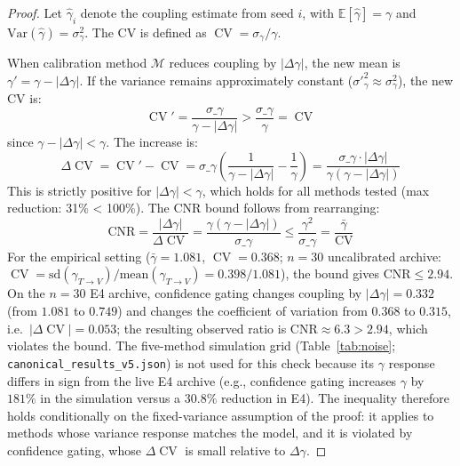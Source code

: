\documentclass[11pt]{article}
\DeclareMathOperator{\CV}{CV}
\begin{document}
\begin{proof}
Let $\hat{\gamma}_i$ denote the coupling estimate from seed $i$, with $\mathbb{E}[\hat{\gamma}] = \gamma$ and $\text{Var}(\hat{\gamma}) = \sigma^2_{\gamma}$. The CV is defined as $\CV = \sigma_{\gamma} / \gamma$.

When calibration method $\mathcal{M}$ reduces coupling by $|\Delta\gamma|$, the new mean is $\gamma' = \gamma - |\Delta\gamma|$. If the variance remains approximately constant ($\sigma'^2_{\gamma} \approx \sigma^2_{\gamma}$), the new CV is:
\begin{equation}
    \CV' = \frac{\sigma\_{\gamma}}{\gamma - |\Delta\gamma|} > \frac{\sigma\_{\gamma}}{\gamma} = \CV
\end{equation}
since $\gamma - |\Delta\gamma| < \gamma$. The increase is:
\begin{equation}
    \Delta\CV = \CV' - \CV = \sigma\_{\gamma} \left(\frac{1}{\gamma - |\Delta\gamma|} - \frac{1}{\gamma}\right) = \frac{\sigma\_{\gamma} \cdot |\Delta\gamma|}{\gamma(\gamma - |\Delta\gamma|)}
\end{equation}
This is strictly positive for $|\Delta\gamma| < \gamma$, which holds for all methods tested (max reduction: 31\% < 100\%). The CNR bound follows from rearranging:
\begin{equation}
    \text{CNR} = \frac{|\Delta\gamma|}{\Delta\CV} = \frac{\gamma(\gamma - |\Delta\gamma|)}{\sigma\_{\gamma}} \leq \frac{\gamma^2}{\sigma\_{\gamma}} = \frac{\bar{\gamma}}{\CV}
\end{equation}
For the empirical setting ($\bar{\gamma} = 1.081$, $\CV = 0.368$; $n{=}30$ uncalibrated archive: $\CV = \mathrm{sd}(\gamma_{T\to V})/\mathrm{mean}(\gamma_{T\to V}) = 0.398/1.081$), the bound gives $\text{CNR} \leq 2.94$. On the $n{=}30$ E4 archive, confidence gating changes coupling by $|\Delta\gamma| = 0.332$ (from $1.081$ to $0.749$) and changes the coefficient of variation from $0.368$ to $0.315$, i.e.\ $|\Delta\CV| = 0.053$; the resulting observed ratio is $\text{CNR} \approx 6.3 > 2.94$, which violates the bound. The five-method simulation grid (Table~\ref{tab:noise}; \texttt{canonical\_results\_v5.json}) is not used for this check because its $\gamma$ response differs in sign from the live E4 archive (e.g., confidence gating increases $\gamma$ by $181\%$ in the simulation versus a $30.8\%$ reduction in E4). The inequality therefore holds conditionally on the fixed-variance assumption of the proof: it applies to methods whose variance response matches the model, and it is violated by confidence gating, whose $\Delta\CV$ is small relative to $\Delta\gamma$.
\end{proof}
\end{document}
